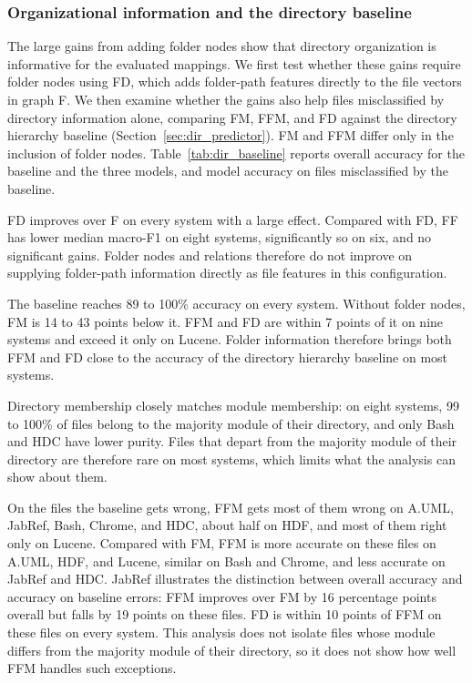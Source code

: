 \subsubsection{Organizational information and the directory baseline\label{sec:directory_errors}}

The large gains from adding folder nodes show that directory organization is informative for the evaluated mappings. We first test whether these gains require folder nodes using FD, which adds folder-path features directly to the \ft{} file vectors in graph F. We then examine whether the gains also help files misclassified by directory information alone, comparing FM, FFM, and FD against the directory hierarchy baseline (Section~\ref{sec:dir_predictor}). FM and FFM differ only in the inclusion of folder nodes. Table~\ref{tab:dir_baseline} reports overall accuracy for the baseline and the three models, and model accuracy on files misclassified by the baseline.

FD improves over F on every system with a large effect. Compared with FD, FF has lower median macro-F1 on eight systems, significantly so on six, and no significant gains. Folder nodes and relations therefore do not improve on supplying folder-path information directly as file features in this configuration.

The baseline reaches 89 to 100\% accuracy on every system. Without folder nodes, FM is 14 to 43 points below it. FFM and FD are within 7 points of it on nine systems and exceed it only on Lucene. Folder information therefore brings both FFM and FD close to the accuracy of the directory hierarchy baseline on most systems.

Directory membership closely matches module membership: on eight systems, 99 to 100\% of files belong to the majority module of their directory, and only Bash and HDC have lower purity. Files that depart from the majority module of their directory are therefore rare on most systems, which limits what the analysis can show about them.

On the files the baseline gets wrong, FFM gets most of them wrong on A.UML, JabRef, Bash, Chrome, and HDC, about half on HDF, and most of them right only on Lucene. Compared with FM, FFM is more accurate on these files on A.UML, HDF, and Lucene, similar on Bash and Chrome, and less accurate on JabRef and HDC. JabRef illustrates the distinction between overall accuracy and accuracy on baseline errors: FFM improves over FM by 16 percentage points overall but falls by 19 points on these files. FD is within 10 points of FFM on these files on every system. This analysis does not isolate files whose module differs from the majority module of their directory, so it does not show how well FFM handles such exceptions.

